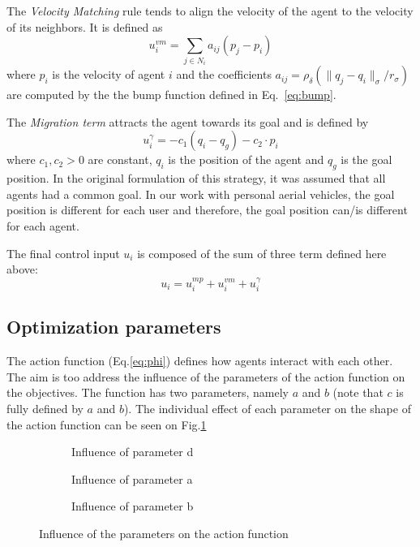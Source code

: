 The \emph{Velocity Matching} rule tends to align the velocity of the agent to the velocity of its neighbors. It is defined as 
\begin{equation}
u_i^{vm}=\sum_{j\in N_i}{a_{ij}(p_j-p_i)}
\label{eq:velocitymatching}
\end{equation}
where $p_i$ is the velocity of agent $i$ and the coefficients $a_{ij}=\rho_{\delta}(\|q_j-q_i\|_{\sigma}/r_{\sigma})$ are computed by the the bump function defined in Eq.~\ref{eq:bump}.


The \emph{Migration term} attracts the agent towards its goal and is defined by
\begin{equation}
u_i^{\gamma}=-c_1(q_i-q_g)-c_2\cdot p_i
\label{eq:migration}
\end{equation}  
where $c_1,c_2>0$ are constant, $q_i$ is the position of the agent and $q_g$ is the goal position. In the original formulation of this strategy, it was assumed that all agents had a common goal. In our work with personal aerial vehicles, the goal position is different for each user and therefore, the goal position can/is different for each agent. 

The final control input $u_i$ is composed of the sum of three term defined here above:
\begin{equation}
u_i=u_i^{mp}+u_i^{vm}+u_i^{\gamma}
\label{eq:input}
\end{equation}

\subsection{Optimization parameters}

The action function (Eq.\ref{eq:phi}) defines how agents interact with each other. The aim is too address the influence of the parameters of the action function on the objectives. The function has two parameters, namely $a$ and $b$ (note that $c$ is fully defined by $a$ and $b$). The individual effect of each parameter on the shape of the action function can be seen on Fig.\ref{fig:effects_actionCurve}

\begin{figure}[h]
    \centering
    \begin{subfigure}[b]{0.5\textwidth}
	    \setlength{\abovecaptionskip}{1pt plus 3pt minus 0pt}
	    
	    \caption{Influence of parameter d}
	\end{subfigure}
    \begin{subfigure}[b]{0.5\textwidth}
		\setlength{\abovecaptionskip}{1pt plus 3pt minus 0pt}	
	    
	    \caption{Influence of parameter a}
	\end{subfigure}
	\begin{subfigure}[b]{0.5\textwidth}
		\setlength{\abovecaptionskip}{1pt plus 3pt minus 0pt}	
	    
	    \caption{Influence of parameter b}
	\end{subfigure}

    \caption{Influence of the parameters on the action function}
    \label{fig:effects_actionCurve}
\end{figure} 
